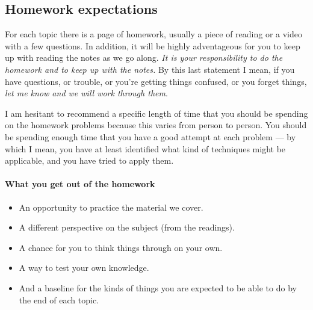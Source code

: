 \subsection*{Homework expectations}
For each topic there is a page of homework, usually a piece of reading or a video with a few questions. In addition,
it will be highly adventageous for you to keep up with reading the notes as we go along. \emph{It is your responsibility
to do the homework and to keep up with the notes.} By this last statement I mean, if you have questions, or trouble,
or you're getting things confused, or you forget things, \emph{let me know and we will work through them}.

I am hesitant to recommend a specific length of time that you should be spending on the homework problems because this varies from
person to person. You should be spending enough time that you have a good attempt at each problem --- by which I mean, you have at
least identified what kind of techniques might be applicable, and you have tried to apply them.

\paragraph{What you get out of the homework}
\begin{itemize}
  \item An opportunity to practice the material we cover.
  \item A different perspective on the subject (from the readings).
  \item A chance for you to think things through on your own.
  \item A way to test your own knowledge.
  \item And a baseline for the kinds of things you are expected to be able to do by the end of each topic.
\end{itemize}

